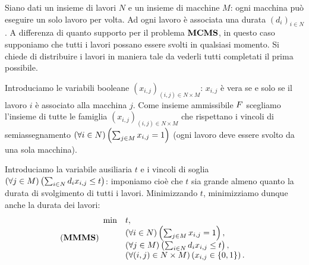 \begin{Example}
	 Siano dati un insieme di lavori $N$ e un insieme di macchine $M$: ogni macchina pu\`o eseguire un solo lavoro per volta. Ad ogni lavoro \`e associata una durata $(d_i)_{i \in N}$. A differenza di quanto supporto per il problema $\textbf{MCMS}$, in questo caso supponiamo che tutti i lavori possano essere svolti in qualsiasi momento. Si chiede di distribuire i lavori in maniera tale da vederli tutti completati il prima possibile.
	\par Introduciamo le variabili booleane $(x_{i,j})_{(i,j) \in N \times M}$: $x_{i,j}$ \`e vera se e solo se il lavoro $i$ \`e associato alla macchina $j$. Come insieme ammissibile $F$ scegliamo l'insieme di tutte le famiglia $(x_{i,j})_{(i,j) \in N \times M}$ che rispettano i vincoli di semiassegnamento $\left ( \forall i \in N \right ) \left ( \sum_{j \in M} x_{i,j} = 1 \right )$ (ogni lavoro deve essere svolto da una sola macchina).
	\par Introduciamo la variabile ausiliaria $t$ e i vincoli di soglia $\left ( \forall j \in M \right ) \left ( \sum_{i \in N} d_ix_{i,j} \leq t \right )$: imponiamo cio\`e che $t$ sia grande almeno quanto la durata di svolgimento di tutti i lavori. Minimizzando $t$, minimizziamo dunque anche la durata dei lavori:
$$(\textbf{MMMS})
\begin{array}{ll}
	\min &t,\\
	&\left ( \forall i \in N \right ) \left ( \sum_{j \in M} x_{i,j} = 1 \right ),\\
	&\left ( \forall j \in M \right ) \left ( \sum_{i \in N} d_ix_{i,j} \leq t \right ),\\
	&\left ( \forall (i,j) \in N \times M \right ) \left ( x_{i,j} \in \lbrace 0, 1 \rbrace \right ).
\end{array}$$
\end{Example}
